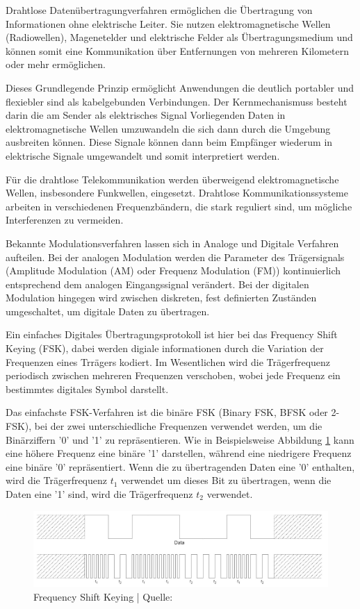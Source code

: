 \label{sec:drahtlosedatenübertragung}
Drahtlose Datenübertragungverfahren ermöglichen die Übertragung von Informationen ohne elektrische Leiter. Sie nutzen elektromagnetische Wellen (Radiowellen), Magenetelder und elektrische Felder als Übertragungsmedium und können somit eine Kommunikation über Entfernungen von mehreren Kilometern oder mehr ermöglichen. 

Dieses Grundlegende Prinzip ermöglicht Anwendungen die deutlich portabler und flexiebler sind als kabelgebunden Verbindungen. Der Kernmechanismuss besteht darin die am Sender als elektrisches Signal Vorliegenden Daten in elektromagnetische Wellen umzuwandeln die sich dann durch die Umgebung ausbreiten können. Diese Signale können dann beim Empfänger wiederum in elektrische Signale umgewandelt und somit interpretiert werden. 

Für die drahtlose Telekommunikation werden überweigend elektromagnetische Wellen, insbesondere Funkwellen, eingesetzt. Drahtlose Kommunikationssysteme arbeiten in verschiedenen Frequenzbändern, die stark reguliert sind, um mögliche Interferenzen zu vermeiden. \autocite{GrundkenntnisseDrahtlosenKommunikation2023} 

Bekannte Modulationsverfahren lassen sich in Analoge und Digitale Verfahren aufteilen. Bei der analogen Modulation werden die Parameter des Trägersignals (Amplitude Modulation (AM) oder Frequenz Modulation (FM)) kontinuierlich entsprechend dem analogen Eingangssignal verändert. Bei der digitalen Modulation hingegen wird zwischen diskreten, fest definierten Zuständen umgeschaltet, um digitale Daten zu übertragen. \autocite[S. 112 ff. und S. 156 ff.]{ziemerPrinciplesCommunicationsSystems2015}

Ein einfaches Digitales Übertragungsprotokoll ist hier bei das Frequency Shift Keying (FSK), dabei werden digiale informationen durch die Variation der Frequenzen eines Trrägers kodiert. Im Wesentlichen wird die Trägerfrequenz periodisch zwischen mehreren Frequenzen verschoben, wobei jede Frequenz ein bestimmtes digitales Symbol darstellt.

Das einfachste FSK-Verfahren ist die binäre FSK (Binary FSK, BFSK oder 2-FSK), bei der zwei unterschiedliche Frequenzen verwendet werden, um die Binärziffern '0' und '1' zu repräsentieren. Wie in Beispielsweise Abbildung \ref{fig:frequency-shift-keying} kann eine höhere Frequenz eine binäre '1' darstellen, während eine niedrigere Frequenz eine binäre '0' repräsentiert. Wenn die zu übertragenden Daten eine '0' enthalten, wird die Trägerfrequenz $t_1$ verwendet um dieses Bit zu übertragen, wenn die Daten eine '1' sind, wird die Trägerfrequenz $t_2$ verwendet.\autocite{FrequencyShiftKeyingModulation2024}

\begin{figure}[H]
\centering
\includegraphics[scale=.5]{figures/asstes/frequency-shift-keying.png}
\caption{Frequency Shift Keying | Quelle: \autocite {FrequencyShiftKeyingModulation2024}}
\label{fig:frequency-shift-keying}
\end{figure}